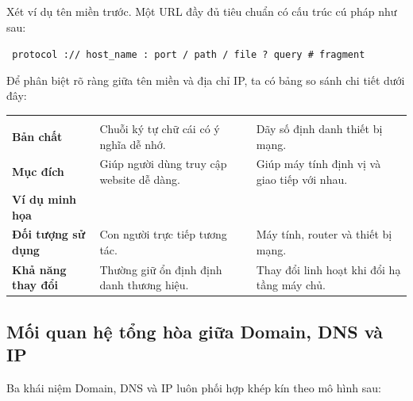 Xét ví dụ tên miền trước. Một URL đầy đủ tiêu chuẩn có cấu trúc cú pháp như sau:
\begin{center}
\texttt{%
\textcolor{primaryBlue}{protocol}%
\textcolor{codeComment}{://}%
\textcolor{codeKey}{host\_name}%
\textcolor{codeComment}{:}%
\textcolor{codeNumber}{port}%
\textcolor{codeComment}{/}%
\textcolor{codeString}{path}%
\textcolor{codeComment}{/}%
\textcolor{codeString}{file}%
\textcolor{codeComment}{?}%
\textcolor{accentOrange}{query}%
\textcolor{codeComment}{\#}%
\textcolor{secondaryTeal}{fragment}%
}
\end{center}

Để phân biệt rõ ràng giữa tên miền và địa chỉ IP, ta có bảng so sánh chi tiết dưới đây:
\begin{prettyTableBox}
\begin{tabularx}{\linewidth}{>{\bfseries\color{primaryBlue}}C{3.2cm} Z Z}
 &  &  \\
Bản chất & Chuỗi ký tự chữ cái có ý nghĩa dễ nhớ. & Dãy số định danh thiết bị mạng. \\
Mục đích & Giúp người dùng truy cập website dễ dàng. & Giúp máy tính định vị và giao tiếp với nhau. \\
Ví dụ minh họa &  &  \\
Đối tượng sử dụng & Con người trực tiếp tương tác. & Máy tính, router và thiết bị mạng. \\
Khả năng thay đổi & Thường giữ ổn định định danh thương hiệu. & Thay đổi linh hoạt khi đổi hạ tầng máy chủ. \\
\end{tabularx}
\end{prettyTableBox}

\subsection{Mối quan hệ tổng hòa giữa Domain, DNS và IP}

Ba khái niệm Domain, DNS và IP luôn phối hợp khép kín theo mô hình sau:

